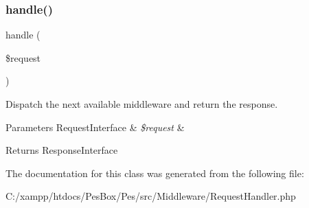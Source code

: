 \subsubsection{\texorpdfstring{handle()}{handle()}}
{\footnotesize\ttfamily handle (\begin{DoxyParamCaption}\item[{Server\+Request\+Interface}]{\$request }\end{DoxyParamCaption})}

Dispatch the next available middleware and return the response.


\begin{DoxyParams}[1]{Parameters}
Request\+Interface & {\em \$request} & \\
\hline
\end{DoxyParams}
\begin{DoxyReturn}{Returns}
Response\+Interface 
\end{DoxyReturn}


The documentation for this class was generated from the following file\+:\begin{DoxyCompactItemize}
\item 
C\+:/xampp/htdocs/\+Pes\+Box/\+Pes/src/\+Middleware/Request\+Handler.\+php\end{DoxyCompactItemize}
